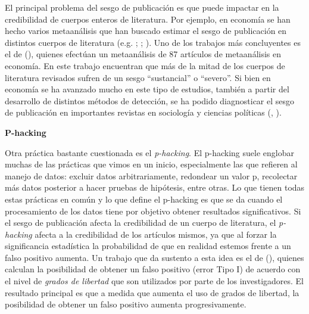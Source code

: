\documentclass[
  spanish,
  a4paper,
  oneside]{scrbook}
\begin{document}
El principal problema del sesgo de publicación es que puede impactar en
la credibilidad de cuerpos enteros de literatura. Por ejemplo, en
economía se han hecho varios metaanálisis que han buscado estimar el
sesgo de publicación en distintos cuerpos de literatura (e.g.
;
;
). Uno de los trabajos más
concluyentes es el de (), quienes efectúan un metaanálisis de 87 artículos de
metaanálisis en economía. En este trabajo encuentran que más de la mitad
de los cuerpos de literatura revisados sufren de un sesgo ``sustancial''
o ``severo''. Si bien en economía se ha avanzado mucho en este tipo de
estudios, también a partir del desarrollo de distintos métodos de
detección, se ha podido diagnosticar el sesgo de publicación en
importantes revistas en sociología y ciencias políticas
(,
).

\textbf{P-hacking}

Otra práctica bastante cuestionada es el \emph{p-hacking}. El p-hacking
suele englobar muchas de las prácticas que vimos en un inicio,
especialmente las que refieren al manejo de datos: excluir datos
arbitrariamente, redondear un valor p, recolectar más datos posterior a
hacer pruebas de hipótesis, entre otras. Lo que tienen todas estas
prácticas en común y lo que define el p-hacking es que se da cuando el
procesamiento de los datos tiene por objetivo obtener resultados
significativos. Si el sesgo de publicación afecta la credibilidad de un
cuerpo de literatura, el \emph{p-hacking} afecta a la credibilidad de
los artículos mismos, ya que al forzar la significancia estadística la
probabilidad de que en realidad estemos frente a un falso positivo
aumenta. Un trabajo que da sustento a esta idea es el de
(), quienes calculan la posibilidad de obtener un falso positivo
(error Tipo I) de acuerdo con el nivel de \emph{grados de libertad} que
son utilizados por parte de los investigadores. El resultado principal
es que a medida que aumenta el uso de grados de libertad, la posibilidad
de obtener un falso positivo aumenta progresivamente.
\end{document}
